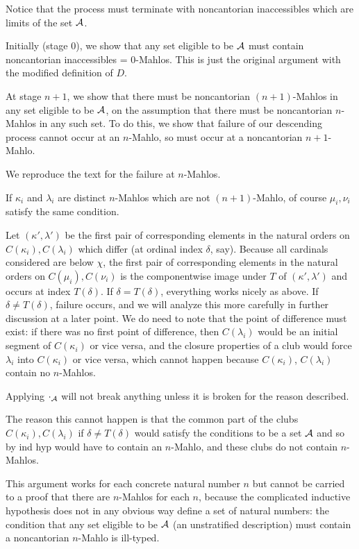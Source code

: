 \documentclass{slides}
\begin{document}
\begin{slide}

Notice that the process must terminate with noncantorian inaccessibles which are limits of the set $\cal A$.

Initially (stage 0), we show that any set eligible to be $\cal A$ must contain noncantorian inaccessibles = 0-Mahlos.  This is just the original argument with the modified definition of $D$.

At stage $n+1$, we show that there must be noncantorian $(n+1)$-Mahlos in any set eligible to be $\cal A$, on the assumption that there must be noncantorian $n$-Mahlos in any such set.  To do this, we show that failure of our descending process cannot occur
at an $n$-Mahlo, so must occur at a noncantorian $n+1$-Mahlo.

We reproduce the text for the failure at $n$-Mahlos.

If $\kappa_i$ and $\lambda_i$ are distinct $n$-Mahlos which are not $(n+1)$-Mahlo, of course $\mu_i,\nu_i$ satisfy the same condition.

 Let $(\kappa',\lambda')$ be the first pair of corresponding elements in the natural orders on $C(\kappa_i),C(\lambda_i)$ which differ (at ordinal index $\delta$, say).  Because all cardinals considered are below $\chi$, the first pair of corresponding elements in the natural orders on $C(\mu_i),C(\nu_i)$ is the componentwise image under
$T$ of $(\kappa',\lambda')$  and occurs at index $T(\delta)$.  If $\delta=T(\delta)$, everything works nicely as above.  If $\delta \neq T(\delta)$, failure occurs, and we will analyze this more carefully in further discussion at a later point.  We do need to note that the point of difference must exist:  if there was no first point of difference,
then $C(\lambda_i)$ would be an initial segment of $C(\kappa_i)$ or vice versa, and the closure properties of a club would force $\lambda_i$ into $C(\kappa_i)$ or
vice versa, which cannot happen because $C(\kappa_i)$, $C(\lambda_i)$ contain no $n$-Mahlos.

Applying $\cdot_{\cal A}$ will not break anything unless it is broken for the reason described.

The reason this cannot happen is that the common part of the clubs $C(\kappa_i),C(\lambda_i)$  if $\delta \neq T(\delta)$ would satisfy the conditions to be a set
$\cal A$ and so by ind hyp would have to contain an $n$-Mahlo, and these clubs do not contain $n$-Mahlos.

This argument works for each concrete natural number $n$ but cannot be carried to a proof that there are $n$-Mahlos for each $n$, because the complicated inductive hypothesis does not in any obvious way define a set of natural numbers:  the condition that any set eligible to be $\cal A$ (an unstratified description) must contain a noncantorian $n$-Mahlo is ill-typed.

\end{slide}
\end{document}
